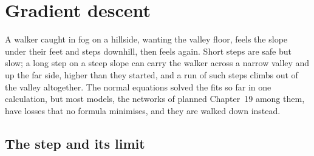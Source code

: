 \section{Gradient descent}
\label{sec:lo-descent}

A walker caught in fog on a hillside, wanting the valley floor, feels the
slope under their feet and steps downhill, then feels again. Short steps
are safe but slow; a long step on a steep slope can carry the walker
across a narrow valley and up the far side, higher than they started,
and a run of such steps climbs out of the valley altogether. The normal
equations solved the fits so far in one calculation, but most models,
the networks of planned Chapter~19 among them, have losses that no formula
minimises, and they are walked down instead.

\subsection*{The step and its limit}

